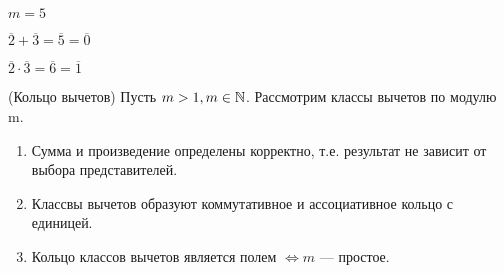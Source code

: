 \begin{eg}
  $m = 5$

  $\overline{2} + \overline{3} = \overline{5} = \overline{0}$

  $\overline{2} \cdot \overline{3} = \overline{6} = \overline{1}$
\end{eg}

\begin{theorem} (Кольцо вычетов)
  Пусть $m > 1, m \in \mathbb{N}$. Рассмотрим классы вычетов по модулю m.

  \begin{enumerate}
    \item Сумма и произведение определены корректно, т.е. результат не зависит от выбора представителей.
    \item Классвы вычетов образуют коммутативное и ассоциативное кольцо с единицей.
    \item Кольцо классов вычетов является полем $\Leftrightarrow m$ --- простое. 
  \end{enumerate}
\end{theorem}

